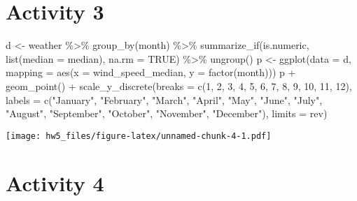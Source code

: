 \documentclass[
]{article}
\newenvironment{Shaded}{\begin{snugshade}}{\end{snugshade}}
\newcommand{\AttributeTok}[1]{\textcolor[rgb]{0.77,0.63,0.00}{#1}}
\newcommand{\ConstantTok}[1]{\textcolor[rgb]{0.00,0.00,0.00}{#1}}
\newcommand{\DecValTok}[1]{\textcolor[rgb]{0.00,0.00,0.81}{#1}}
\newcommand{\FunctionTok}[1]{\textcolor[rgb]{0.00,0.00,0.00}{#1}}
\newcommand{\NormalTok}[1]{#1}
\newcommand{\OtherTok}[1]{\textcolor[rgb]{0.56,0.35,0.01}{#1}}
\newcommand{\SpecialCharTok}[1]{\textcolor[rgb]{0.00,0.00,0.00}{#1}}
\newcommand{\StringTok}[1]{\textcolor[rgb]{0.31,0.60,0.02}{#1}}
\begin{document}
\hypertarget{activity-3}{%
\section{Activity 3}\label{activity-3}}

\begin{Shaded}
\begin{Highlighting}[]
\NormalTok{d }\OtherTok{\textless{}{-}}\NormalTok{ weather }\SpecialCharTok{\%\textgreater{}\%}
    \FunctionTok{group\_by}\NormalTok{(month) }\SpecialCharTok{\%\textgreater{}\%}
    \FunctionTok{summarize\_if}\NormalTok{(is.numeric, }\FunctionTok{list}\NormalTok{(}\AttributeTok{median =}\NormalTok{ median), }\AttributeTok{na.rm =} \ConstantTok{TRUE}\NormalTok{) }\SpecialCharTok{\%\textgreater{}\%}
    \FunctionTok{ungroup}\NormalTok{()}
\NormalTok{p }\OtherTok{\textless{}{-}} \FunctionTok{ggplot}\NormalTok{(}\AttributeTok{data =}\NormalTok{ d,}
    \AttributeTok{mapping =} \FunctionTok{aes}\NormalTok{(}\AttributeTok{x =}\NormalTok{ wind\_speed\_median, }\AttributeTok{y =} \FunctionTok{factor}\NormalTok{(month)))}
\NormalTok{p }\SpecialCharTok{+} \FunctionTok{geom\_point}\NormalTok{() }\SpecialCharTok{+} \FunctionTok{scale\_y\_discrete}\NormalTok{(}\AttributeTok{breaks =} \FunctionTok{c}\NormalTok{(}\DecValTok{1}\NormalTok{, }\DecValTok{2}\NormalTok{, }\DecValTok{3}\NormalTok{, }\DecValTok{4}\NormalTok{, }\DecValTok{5}\NormalTok{, }\DecValTok{6}\NormalTok{, }\DecValTok{7}\NormalTok{, }\DecValTok{8}\NormalTok{, }\DecValTok{9}\NormalTok{, }\DecValTok{10}\NormalTok{, }\DecValTok{11}\NormalTok{, }\DecValTok{12}\NormalTok{),}
    \AttributeTok{labels =} \FunctionTok{c}\NormalTok{(}\StringTok{"January"}\NormalTok{, }\StringTok{"February"}\NormalTok{, }\StringTok{"March"}\NormalTok{, }\StringTok{"April"}\NormalTok{, }\StringTok{"May"}\NormalTok{, }\StringTok{"June"}\NormalTok{,}
      \StringTok{"July"}\NormalTok{, }\StringTok{"August"}\NormalTok{, }\StringTok{"September"}\NormalTok{, }\StringTok{"October"}\NormalTok{, }\StringTok{"November"}\NormalTok{, }\StringTok{"December"}\NormalTok{),}
    \AttributeTok{limits =}\NormalTok{ rev)}
\end{Highlighting}
\end{Shaded}

\texttt{[image: hw5\_files/figure-latex/unnamed-chunk-4-1.pdf]}

\hypertarget{activity-4}{%
\section{Activity 4}\label{activity-4}}
\end{document}
